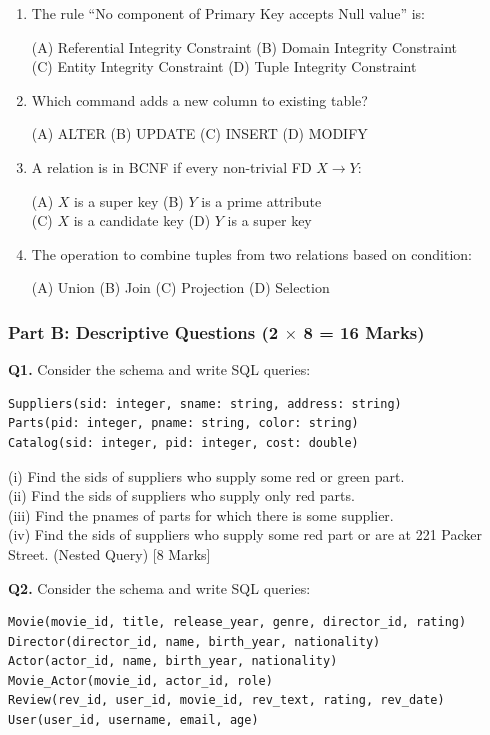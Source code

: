 \documentclass[11pt,a4paper]{article}
\begin{document}
\begin{enumerate}
\item The rule ``No component of Primary Key accepts Null value'' is:

(A) Referential Integrity Constraint \quad (B) Domain Integrity Constraint\\
(C) Entity Integrity Constraint \quad (D) Tuple Integrity Constraint

\item Which command adds a new column to existing table?

(A) ALTER \quad (B) UPDATE \quad (C) INSERT \quad (D) MODIFY

\item A relation is in BCNF if every non-trivial FD $X \to Y$:

(A) $X$ is a super key \quad (B) $Y$ is a prime attribute\\
(C) $X$ is a candidate key \quad (D) $Y$ is a super key

\item The operation to combine tuples from two relations based on condition:

(A) Union \quad (B) Join \quad (C) Projection \quad (D) Selection
\end{enumerate}

\subsubsection*{Part B: Descriptive Questions (2 $\times$ 8 = 16 Marks)}

\textbf{Q1.} Consider the schema and write SQL queries:
\begin{verbatim}
Suppliers(sid: integer, sname: string, address: string)
Parts(pid: integer, pname: string, color: string)
Catalog(sid: integer, pid: integer, cost: double)
\end{verbatim}

(i) Find the sids of suppliers who supply some red or green part.\\
(ii) Find the sids of suppliers who supply only red parts.\\
(iii) Find the pnames of parts for which there is some supplier.\\
(iv) Find the sids of suppliers who supply some red part or are at 221 Packer Street. (Nested Query) \hfill [8 Marks]

\textbf{Q2.} Consider the schema and write SQL queries:
\begin{verbatim}
Movie(movie_id, title, release_year, genre, director_id, rating)
Director(director_id, name, birth_year, nationality)
Actor(actor_id, name, birth_year, nationality)
Movie_Actor(movie_id, actor_id, role)
Review(rev_id, user_id, movie_id, rev_text, rating, rev_date)
User(user_id, username, email, age)
\end{verbatim}
\end{document}
